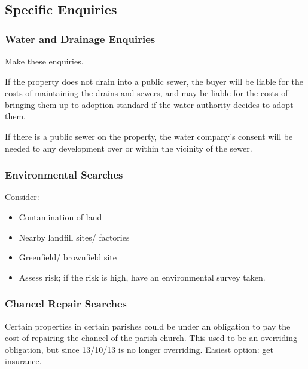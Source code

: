 \documentclass[
]{article}
\providecommand{\tightlist}{%
  \setlength{\itemsep}{0pt}\setlength{\parskip}{0pt}}
\begin{document}
\hypertarget{specific-enquiries}{%
\subsection{Specific Enquiries}\label{specific-enquiries}}

\hypertarget{water-and-drainage-enquiries}{%
\subsubsection{Water and Drainage
Enquiries}\label{water-and-drainage-enquiries}}

Make these enquiries.

If the property does not drain into a public sewer, the buyer will be
liable for the costs of maintaining the drains and sewers, and may be
liable for the costs of bringing them up to adoption standard if the
water authority decides to adopt them.

If there is a public sewer on the property, the water company's consent
will be needed to any development over or within the vicinity of the
sewer.

\hypertarget{environmental-searches}{%
\subsubsection{Environmental Searches}\label{environmental-searches}}

Consider:

\begin{itemize}
\tightlist
\item
  Contamination of land
\item
  Nearby landfill sites/ factories
\item
  Greenfield/ brownfield site
\item
  Assess risk; if the risk is high, have an environmental survey taken.
\end{itemize}

\hypertarget{chancel-repair-searches}{%
\subsubsection{Chancel Repair Searches}\label{chancel-repair-searches}}

Certain properties in certain parishes could be under an obligation to
pay the cost of repairing the chancel of the parish church. This used to
be an overriding obligation, but since 13/10/13 is no longer overriding.
Easiest option: get insurance.
\end{document}
